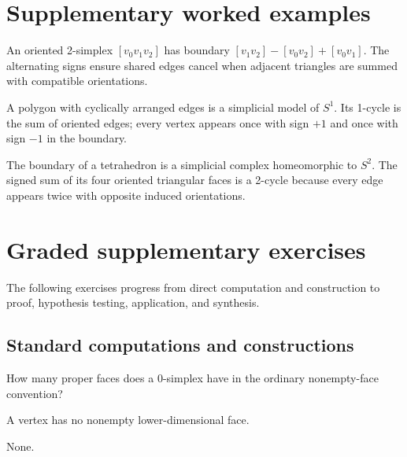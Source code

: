 \section{Supplementary worked examples}
\label{sec:viii15-pedagogy}

\begin{example}\label{ex:viii15-ped-01}
An oriented 2-simplex $[v_0v_1v_2]$ has boundary $[v_1v_2]-[v_0v_2]+[v_0v_1]$.  The alternating signs ensure shared edges cancel when adjacent triangles are summed with compatible orientations.
\end{example}

\begin{example}\label{ex:viii15-ped-02}
A polygon with cyclically arranged edges is a simplicial model of $S^1$.  Its 1-cycle is the sum of oriented edges; every vertex appears once with sign $+1$ and once with sign $-1$ in the boundary.
\end{example}

\begin{example}\label{ex:viii15-ped-03}
The boundary of a tetrahedron is a simplicial complex homeomorphic to $S^2$.  The signed sum of its four oriented triangular faces is a 2-cycle because every edge appears twice with opposite induced orientations.
\end{example}

\section{Graded supplementary exercises}
The following exercises progress from direct computation and construction to proof, hypothesis testing, application, and synthesis.

\subsection*{Standard computations and constructions}

\begin{exercise}\label{exr:viii15-ped-01}
How many proper faces does a 0-simplex have in the ordinary nonempty-face convention?
\end{exercise}
\begin{hint}
A vertex has no nonempty lower-dimensional face.
\end{hint}
\begin{solution}
None.
\end{solution}

